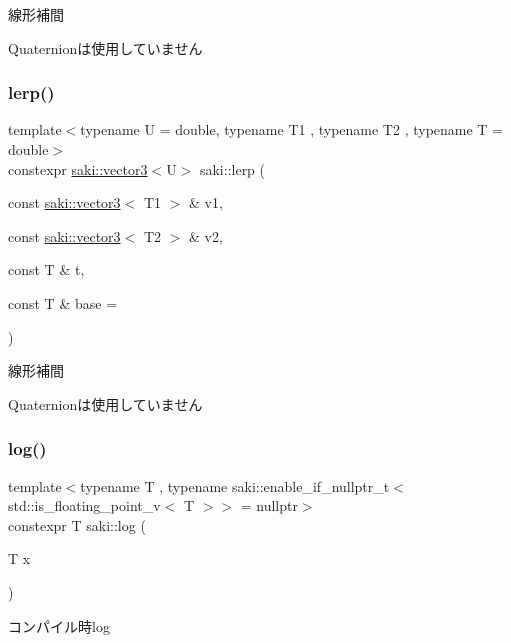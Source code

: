 線形補間 

Quaternionは使用していません \mbox{\label{namespacesaki_a1dc5233651ca71b38ed5a53ef304e480}} 
\subsubsection{\texorpdfstring{lerp()}{lerp()}\hspace{0.1cm}{\footnotesize\ttfamily [3/3]}}
{\footnotesize\ttfamily template$<$typename U  = double, typename T1 , typename T2 , typename T  = double$>$ \\
constexpr \mbox{\hyperlink{classsaki_1_1vector3}{saki\+::vector3}}$<$U$>$ saki\+::lerp (\begin{DoxyParamCaption}\item[{const \mbox{\hyperlink{classsaki_1_1vector3}{saki\+::vector3}}$<$ T1 $>$ \&}]{v1,  }\item[{const \mbox{\hyperlink{classsaki_1_1vector3}{saki\+::vector3}}$<$ T2 $>$ \&}]{v2,  }\item[{const T \&}]{t,  }\item[{const T \&}]{base = {} }\end{DoxyParamCaption})}



線形補間 

Quaternionは使用していません \mbox{\label{namespacesaki_a64136b916afd50ceb9bfb93ae12c63fb}} 
\subsubsection{\texorpdfstring{log()}{log()}\hspace{0.1cm}{\footnotesize\ttfamily [1/2]}}
{\footnotesize\ttfamily template$<$typename T , typename saki\+::enable\+\_\+if\+\_\+nullptr\+\_\+t$<$ std\+::is\+\_\+floating\+\_\+point\+\_\+v$<$ T $>$$>$  = nullptr$>$ \\
constexpr T saki\+::log (\begin{DoxyParamCaption}\item[{T}]{x }\end{DoxyParamCaption})}



コンパイル時log 

\mbox{\label{namespacesaki_a7f260fd4311e2bd21ae770f8aed6fa81}} 
